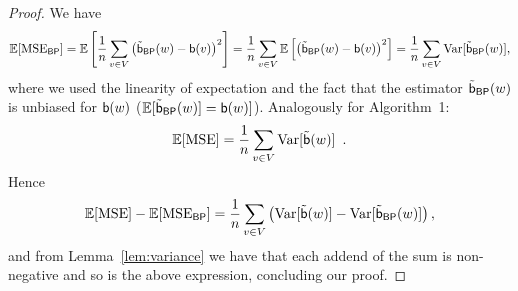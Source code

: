 \begin{proof}
  We have
  \[ 
  \mathbb{E}[\mathrm{MSE}_\mathsf{BP}] = \mathbb{E}\left[\frac{1}{n}\sum_{v\in
  V}\left(\tilde{\mathsf{b}}_\mathsf{BP}(w)-\mathsf{b}(v)\right)^2\right]=\frac{1}{n}\sum_{v\in
  V}\mathbb{E}\left[\left(\tilde{\mathsf{b}}_\mathsf{BP}(w)-\mathsf{b}(v)\right)^2\right]=\frac{1}{n}\sum_{v\in
  V}\mathrm{Var}[\tilde{\mathsf{b}}_\mathsf{BP}(w)],
  \]
  where we used the linearity of expectation and the fact that the estimator
  $\tilde{\mathsf{b}}_\mathsf{BP}(w)$ is unbiased for $\mathsf{b}(w)$ ($\mathbb{E}[\tilde{\mathsf{b}}_\mathsf{BP}(w)]=\mathsf{b}(w)]$).
  Analogously for Algorithm~1:
  \[
  \mathbb{E}[\mathrm{MSE}] = \frac{1}{n}\sum_{v\in V}\mathrm{Var}[\tilde{\mathsf{b}}(w)]\enspace.
  \]
  Hence
  \[
  \mathbb{E}[\mathrm{MSE}]-\mathbb{E}[\mathrm{MSE}_\mathsf{BP}]=\frac{1}{n}\sum_{v\in
  V}\left(\mathrm{Var}[\tilde{\mathsf{b}}(w)]-\mathrm{Var}[\tilde{\mathsf{b}}_\mathsf{BP}(w)]\right),
  \]
  and from Lemma~\ref{lem:variance} we have that each addend of the sum is
  non-negative and so is the above expression, concluding our proof.
\end{proof}

